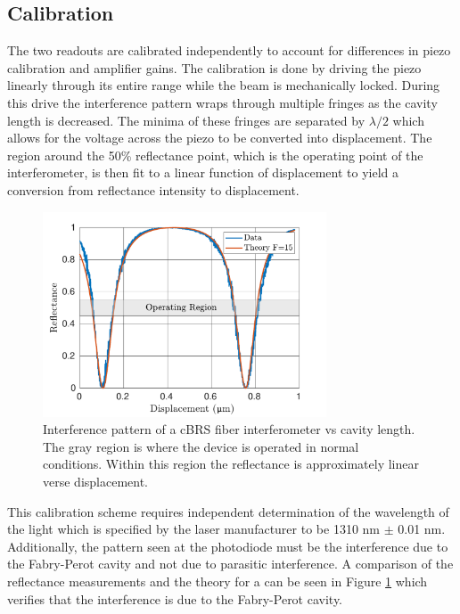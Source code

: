 \documentclass [12pt, proquest]{uwthesis}[2019]
\begin{document}
\subsection{Calibration}

The two readouts are calibrated independently to account for differences in piezo calibration and amplifier gains. The calibration is done by driving the piezo linearly through its entire range while the beam is mechanically locked. During this drive the interference pattern wraps through multiple fringes as the cavity length is decreased. The minima of these fringes are separated by $\lambda/2$ which allows for the voltage across the piezo to be converted into displacement. The region around the 50\% reflectance point, which is the operating point of the interferometer, is then fit to a linear function of displacement to yield a conversion from reflectance intensity to displacement.  

\begin{figure}[!h]
\begin{center}
 \includegraphics[width=0.75\textwidth]{cBRS_FringesEdit.pdf}
\caption[Interference pattern of a cBRS fiber interferometer vs cavity length]{Interference pattern of a cBRS fiber interferometer vs cavity length. The gray region is where the device is operated in normal conditions. Within this region the reflectance is approximately linear verse displacement.}
\label{cBRS_fringes}
\end{center}
\end{figure}

This calibration scheme requires independent determination of the wavelength of the light which is specified by the laser manufacturer to be 1310 nm $\pm$ 0.01 nm. Additionally, the pattern seen at the photodiode must be the interference due to the Fabry-Perot cavity and not due to parasitic interference. A comparison of the reflectance measurements and the theory for a can be seen in Figure \ref{cBRS_fringes} which verifies that the interference is due to the Fabry-Perot cavity.
\end{document}
